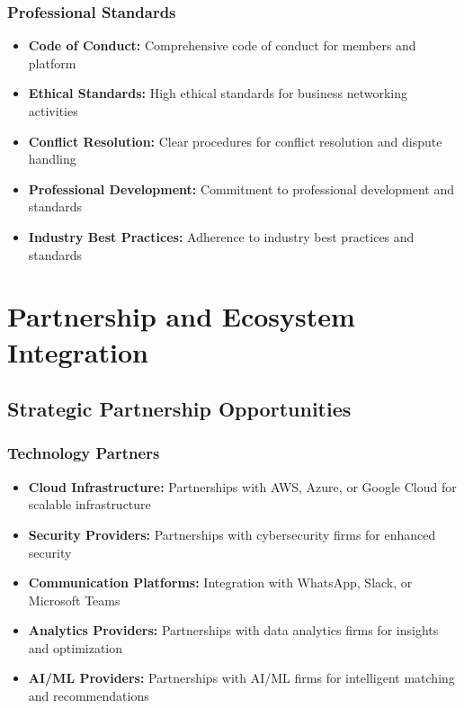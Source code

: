 \subsubsection{Professional Standards}
\begin{itemize}
    \item \textbf{Code of Conduct:} Comprehensive code of conduct for members and platform
    \item \textbf{Ethical Standards:} High ethical standards for business networking activities
    \item \textbf{Conflict Resolution:} Clear procedures for conflict resolution and dispute handling
    \item \textbf{Professional Development:} Commitment to professional development and standards
    \item \textbf{Industry Best Practices:} Adherence to industry best practices and standards
\end{itemize}

\section{Partnership and Ecosystem Integration}

\subsection{Strategic Partnership Opportunities}

\subsubsection{Technology Partners}
\begin{itemize}
    \item \textbf{Cloud Infrastructure:} Partnerships with AWS, Azure, or Google Cloud for scalable infrastructure
    \item \textbf{Security Providers:} Partnerships with cybersecurity firms for enhanced security
    \item \textbf{Communication Platforms:} Integration with WhatsApp, Slack, or Microsoft Teams
    \item \textbf{Analytics Providers:} Partnerships with data analytics firms for insights and optimization
    \item \textbf{AI/ML Providers:} Partnerships with AI/ML firms for intelligent matching and recommendations
\end{itemize}

